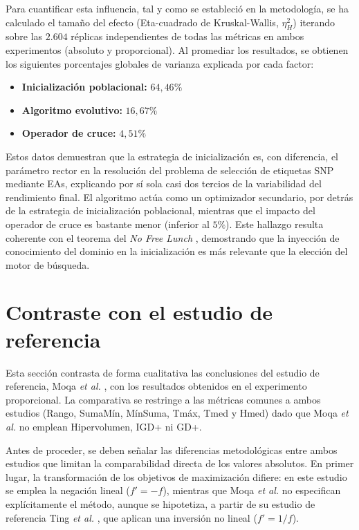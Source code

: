 Para cuantificar esta influencia, tal y como se estableció en la metodología, se ha calculado el tamaño del efecto (Eta-cuadrado de Kruskal-Wallis, $\eta^2_H$) iterando sobre las $2.604$ réplicas independientes de todas las métricas en ambos experimentos (absoluto y proporcional). Al promediar los resultados, se obtienen los siguientes porcentajes globales de varianza explicada por cada factor:

\begin{itemize}
    \item \textbf{Inicialización poblacional:} $64{,}46\%$
    \item \textbf{Algoritmo evolutivo:} $16{,}67\%$
    \item \textbf{Operador de cruce:} $4{,}51\%$
\end{itemize}

Estos datos demuestran que la estrategia de inicialización es, con diferencia, el parámetro rector en la resolución del problema de selección de etiquetas SNP mediante EAs, explicando por sí sola casi dos tercios de la variabilidad del rendimiento final. El algoritmo actúa como un optimizador secundario, por detrás de la estrategia de inicialización poblacional, mientras que el impacto del operador de cruce es bastante menor (inferior al $5\%$). Este hallazgo resulta coherente con el teorema del \textit{No Free Lunch} \cite{wolpert1997no}, demostrando que la inyección de conocimiento del dominio en la inicialización es más relevante que la elección del motor de búsqueda.

\section{Contraste con el estudio de referencia}
\label{sec:contraste_moqa}

Esta sección contrasta de forma cualitativa las conclusiones del estudio de referencia, Moqa \textit{et al.} \cite{moqa2022assessing}, con los resultados obtenidos en el experimento proporcional. La comparativa se restringe a las métricas comunes a ambos estudios (Rango, SumaMín, MínSuma, Tmáx, Tmed y Hmed) dado que Moqa \textit{et al.} no emplean Hipervolumen, IGD+ ni GD+.

Antes de proceder, se deben señalar las diferencias metodológicas entre ambos estudios que limitan la comparabilidad directa de los valores absolutos. En primer lugar, la transformación de los objetivos de maximización difiere: en este estudio se emplea la negación lineal ($f' = -f$), mientras que Moqa \textit{et al.} no especifican explícitamente el método, aunque se hipotetiza, a partir de su estudio de referencia Ting \textit{et al.} \cite{ting2010multi}, que aplican una inversión no lineal ($f' = 1/f$).

